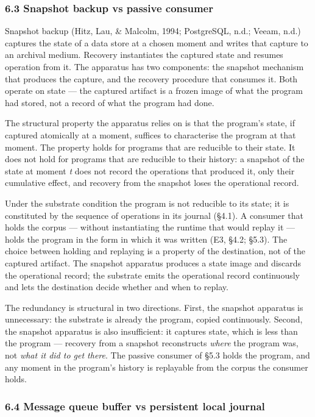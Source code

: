 \documentclass[
]{article}
\begin{document}
\subsubsection{6.3 Snapshot backup vs passive
consumer}\label{snapshot-backup-vs-passive-consumer}

Snapshot backup (Hitz, Lau, \& Malcolm, 1994; PostgreSQL, n.d.; Veeam,
n.d.) captures the state of a data store at a chosen moment and writes
that capture to an archival medium. Recovery instantiates the captured
state and resumes operation from it. The apparatus has two components:
the snapshot mechanism that produces the capture, and the recovery
procedure that consumes it. Both operate on state --- the captured
artifact is a frozen image of what the program had stored, not a record
of what the program had done.

The structural property the apparatus relies on is that the program's
state, if captured atomically at a moment, suffices to characterise the
program at that moment. The property holds for programs that are
reducible to their state. It does not hold for programs that are
reducible to their history: a snapshot of the state at moment \emph{t}
does not record the operations that produced it, only their cumulative
effect, and recovery from the snapshot loses the operational record.

Under the substrate condition the program is not reducible to its state;
it is constituted by the sequence of operations in its journal (§4.1). A
consumer that holds the corpus --- without instantiating the runtime
that would replay it --- holds the program in the form in which it was
written (E3, §4.2; §5.3). The choice between holding and replaying is a
property of the destination, not of the captured artifact. The snapshot
apparatus produces a state image and discards the operational record;
the substrate emits the operational record continuously and lets the
destination decide whether and when to replay.

The redundancy is structural in two directions. First, the snapshot
apparatus is unnecessary: the substrate is already the program, copied
continuously. Second, the snapshot apparatus is also insufficient: it
captures state, which is less than the program --- recovery from a
snapshot reconstructs \emph{where} the program was, not \emph{what it
did to get there}. The passive consumer of §5.3 holds the program, and
any moment in the program's history is replayable from the corpus the
consumer holds.

\subsubsection{6.4 Message queue buffer vs persistent local
journal}\label{message-queue-buffer-vs-persistent-local-journal}
\end{document}

